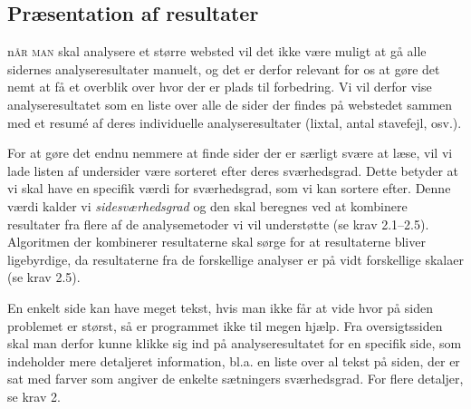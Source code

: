 \documentclass[a4paper,oneside,article, titlepage]{article}
\begin{document}
\subsection{Præsentation af resultater}
\lettrine[lines=5,findent=0.5em,loversize=0.07,nindent=0em,image=true]%
{n}{år man} skal analysere et større websted vil det ikke være muligt at
gå alle sidernes analyseresultater manuelt, og det er derfor relevant
for os at gøre det nemt at få et overblik over hvor der er plads til
forbedring. Vi vil derfor vise analyseresultatet som en liste over
alle de sider der findes på webstedet sammen med et resumé af deres
individuelle analyseresultater (lixtal, antal stavefejl, osv.).

For at gøre det endnu nemmere at finde sider der er særligt svære at
læse, vil vi lade listen af undersider være sorteret efter deres
sværhedsgrad. Dette betyder at vi skal have en specifik værdi for
sværhedsgrad, som vi kan sortere efter. Denne værdi kalder vi
\textit{sidesværhedsgrad} og den skal beregnes ved at kombinere
resultater fra flere af de analysemetoder vi vil understøtte (se krav
2.1--2.5). Algoritmen der kombinerer resultaterne skal sørge for
at resultaterne bliver ligebyrdige, da resultaterne fra de forskellige
analyser er på vidt forskellige skalaer (se krav 2.5).

En enkelt side kan have meget tekst, hvis man ikke får at vide hvor på
siden problemet er størst, så er programmet ikke til megen hjælp. Fra
oversigtssiden skal man derfor kunne klikke sig ind på
analyseresultatet for en specifik side, som indeholder mere detaljeret
information, bl.a. en liste over al tekst på siden, der er sat med
farver som angiver de enkelte sætningers sværhedsgrad. For flere
detaljer, se krav 2.
\end{document}
